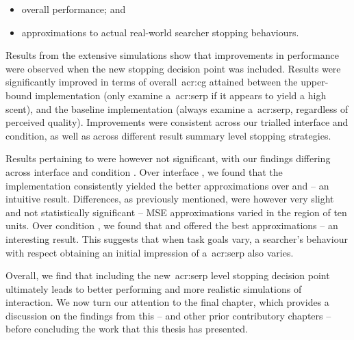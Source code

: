 \begin{itemize}
    \item{ overall performance; and}
    \item{ approximations to actual real-world searcher stopping behaviours.}
\end{itemize}

Results from the extensive simulations show that improvements in performance were observed when the new stopping decision point was included. Results were significantly improved in terms of overall~\gls{acr:cg} attained between the upper-bound  implementation (only examine a~\gls{acr:serp} if it appears to yield a high scent), and the baseline  implementation (always examine a~\gls{acr:serp}, regardless of perceived quality). Improvements were consistent across our trialled interface and condition, as well as across different result summary level stopping strategies.

Results pertaining to  were however not significant, with our findings differing across interface  and condition . Over interface , we found that the  implementation consistently yielded the better approximations over  and  -- an intuitive result. Differences, as previously mentioned, were however very slight and not statistically significant -- MSE approximations varied in the region of ten units. Over condition , we found that  and  offered the best approximations -- an interesting result. This suggests that when task goals vary, a searcher's behaviour with respect obtaining an initial impression of a~\gls{acr:serp} also varies.

Overall, we find that including the new~\gls{acr:serp} level stopping decision point ultimately leads to better performing and more realistic simulations of interaction. We now turn our attention to the final chapter, which provides a discussion on the findings from this -- and other prior contributory chapters -- before concluding the work that this thesis has presented.

\newpage
\thispagestyle{empty}
\mbox{}